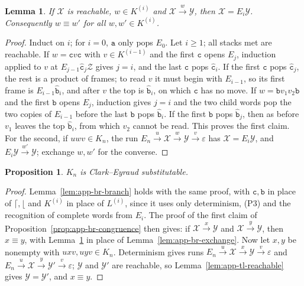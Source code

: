 \documentclass[11pt]{article}
\numberwithin{equation}{section}
\theoremstyle{plain}
\newtheorem{lemma}[theorem]{Lemma}
\newtheorem{proposition}[theorem]{Proposition}
\theoremstyle{definition}
\theoremstyle{remark}
\newcommand{\eps}{\varepsilon}
\begin{document}
\begin{lemma}\label{lem:app-tl-recognition}
If $\mathcal X$ is reachable, $w\in K^{(i)}$ and $\mathcal X\xrightarrow{w}\mathcal Y$, then
$\mathcal X=E_i\mathcal Y$.  Consequently $w\equiv w'$ for all $w,w'\in K^{(i)}$.
\end{lemma}

\begin{proof}
Induct on $i$; for $i=0$, $\mathtt a$ only pops $E_0$.  Let $i\ge1$; all stacks
met are reachable.  If $w=\mathtt cv\mathtt c$ with $v\in K^{(i-1)}$ and the first
$\mathtt c$ opens $E_j$, induction applied to $v$ at $E_{j-1}\hat{\mathtt c}_j\mathcal Z$
gives $j=i$, and the last $\mathtt c$ pops $\hat{\mathtt c}_i$.  If the first
$\mathtt c$ pops $\hat{\mathtt c}_j$, the rest is a product of frames; to read $v$ it
must begin with $E_{i-1}$, so its first frame is $E_{i-1}\hat{\mathtt b}_i$, and after
$v$ the top is $\hat{\mathtt b}_i$, on which $\mathtt c$ has no move.  If
$w=\mathtt bv_1v_2\mathtt b$ and the first $\mathtt b$ opens $E_j$, induction gives
$j=i$ and the two child words pop the two copies of $E_{i-1}$ before the last
$\mathtt b$ pops $\hat{\mathtt b}_i$.  If the first $\mathtt b$ pops $\hat{\mathtt b}_j$,
then as before $v_1$ leaves the top $\hat{\mathtt b}_i$, from which $v_2$ cannot be
read.  This proves the first claim.  For the second, if $uwv\in K_n$, the run
$E_n\xrightarrow{u}\mathcal X\xrightarrow{w}\mathcal Y\xrightarrow{v}\eps$ has
$\mathcal X=E_i\mathcal Y$, and $E_i\mathcal Y\xrightarrow{w'}\mathcal Y$; exchange $w,w'$
for the converse.
\end{proof}

\begin{proposition}\label{prop:app-tl-congruence}
$K_n$ is Clark--Eyraud substitutable.
\end{proposition}

\begin{proof}
Lemma~\ref{lem:app-br-branch} holds with the same proof, with $\mathtt c,\mathtt b$
in place of $\lceil,\lfloor$ and $K^{(i)}$ in place of $L^{(i)}$, since it uses only
determinism, (P3) and the recognition of complete words from $E_i$.  The proof
of the first claim of Proposition~\ref{prop:app-br-congruence} then gives: if
$\mathcal X\xrightarrow{x}\mathcal Y$ and $\mathcal X\xrightarrow{y}\mathcal Y$, then
$x\equiv y$, with Lemma~\ref{lem:app-tl-recognition} in place of
Lemma~\ref{lem:app-br-exchange}.  Now let $x,y$ be nonempty with
$uxv,uyv\in K_n$.  Determinism gives runs
$E_n\xrightarrow{u}\mathcal X\xrightarrow{x}\mathcal Y\xrightarrow{v}\eps$ and
$E_n\xrightarrow{u}\mathcal X\xrightarrow{y}\mathcal Y'\xrightarrow{v}\eps$; $\mathcal Y$ and
$\mathcal Y'$ are reachable, so Lemma~\ref{lem:app-tl-reachable} gives
$\mathcal Y=\mathcal Y'$, and $x\equiv y$.
\end{proof}
\end{document}
